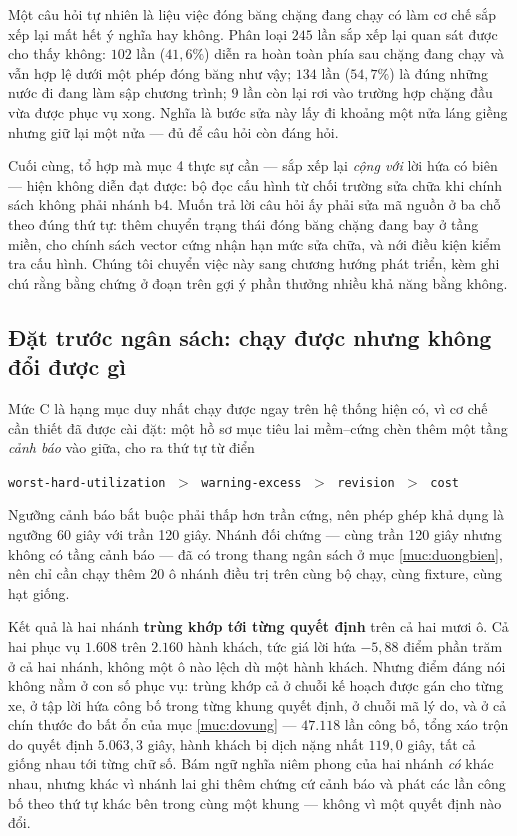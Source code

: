 Một câu hỏi tự nhiên là liệu việc đóng băng chặng đang chạy có làm cơ chế sắp xếp lại mất hết ý
nghĩa hay không. Phân loại $245$ lần sắp xếp lại quan sát được cho thấy không: $102$ lần
($41{,}6\%$) diễn ra hoàn toàn phía sau chặng đang chạy và vẫn hợp lệ dưới một phép đóng băng
như vậy; $134$ lần ($54{,}7\%$) là đúng những nước đi đang làm sập chương trình; $9$ lần còn lại
rơi vào trường hợp chặng đầu vừa được phục vụ xong. Nghĩa là bước sửa này lấy đi khoảng một nửa
láng giềng nhưng giữ lại một nửa --- đủ để câu hỏi còn đáng hỏi.

Cuối cùng, tổ hợp mà mục 4 thực sự cần --- sắp xếp lại \emph{cộng với} lời hứa có biên --- hiện
không diễn đạt được: bộ đọc cấu hình từ chối trường sửa chữa khi chính sách không phải nhánh
b4. Muốn trả lời câu hỏi ấy phải sửa mã nguồn ở ba chỗ theo đúng thứ tự: thêm chuyển trạng thái
đóng băng chặng đang bay ở tầng miền, cho chính sách vector cứng nhận hạn mức sửa chữa, và nới
điều kiện kiểm tra cấu hình. Chúng tôi chuyển việc này sang chương hướng phát triển, kèm ghi chú
rằng bằng chứng ở đoạn trên gợi ý phần thưởng nhiều khả năng bằng không.

\subsection{Đặt trước ngân sách: chạy được nhưng không đổi được gì}

Mức C là hạng mục duy nhất chạy được ngay trên hệ thống hiện có, vì cơ chế cần thiết đã được
cài đặt: một hồ sơ mục tiêu lai mềm--cứng chèn thêm một tầng \emph{cảnh báo} vào giữa, cho ra
thứ tự từ điển

\begin{center}
\texttt{worst-hard-utilization} $\;>\;$ \texttt{warning-excess} $\;>\;$
\texttt{revision} $\;>\;$ \texttt{cost}
\end{center}

Ngưỡng cảnh báo bắt buộc phải thấp hơn trần cứng, nên phép ghép khả dụng là ngưỡng 60 giây với
trần 120 giây. Nhánh đối chứng --- cùng trần 120 giây nhưng không có tầng cảnh báo --- đã có
trong thang ngân sách ở mục \ref{muc:duongbien}, nên chỉ cần chạy thêm 20 ô nhánh điều trị trên
cùng bộ chạy, cùng fixture, cùng hạt giống.

Kết quả là hai nhánh \textbf{trùng khớp tới từng quyết định} trên cả hai mươi ô. Cả hai phục vụ
$1.608$ trên $2.160$ hành khách, tức giá lời hứa $-5{,}88$ điểm phần trăm ở cả hai nhánh, không
một ô nào lệch dù một hành khách. Nhưng điểm đáng nói không nằm ở con số phục vụ: trùng khớp cả
ở chuỗi kế hoạch được gán cho từng xe, ở tập lời hứa công bố trong từng khung quyết định, ở chuỗi
mã lý do, và ở cả chín thước đo bất ổn của mục \ref{muc:dovung} --- $47.118$ lần công bố, tổng
xáo trộn do quyết định $5.063{,}3$ giây, hành khách bị dịch nặng nhất $119{,}0$ giây, tất cả
giống nhau tới từng chữ số. Bám ngữ nghĩa niêm phong của hai nhánh \emph{có} khác nhau, nhưng
khác vì nhánh lai ghi thêm chứng cứ cảnh báo và phát các lần công bố theo thứ tự khác bên trong
cùng một khung --- không vì một quyết định nào đổi.

